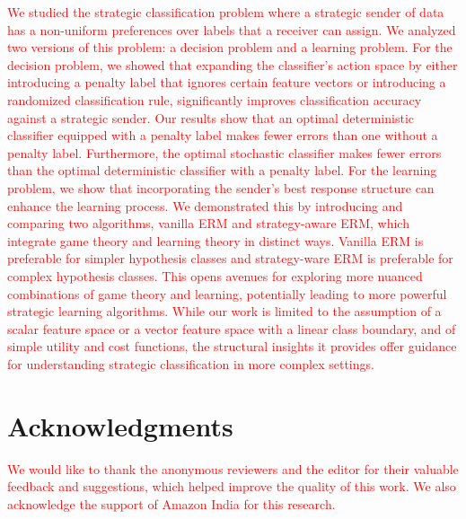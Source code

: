 \textcolor{red}{We studied the strategic classification problem where a strategic sender of data
has a non-uniform preferences over labels that a receiver can assign. We analyzed two versions of this problem: a decision 
problem and a learning problem. For the decision problem, we showed that expanding the classifier’s action space by either introducing a 
penalty label that ignores certain feature vectors or introducing a randomized classification rule, 
significantly improves classification accuracy against a strategic sender. Our results show that an optimal deterministic classifier equipped with a penalty label makes fewer errors than one without a 
penalty label. Furthermore, the optimal stochastic classifier makes fewer errors than the optimal 
deterministic classifier with a penalty label.
For the learning problem, we show that incorporating the sender's best response structure can enhance the 
learning 
process. We demonstrated this by introducing and comparing two algorithms, vanilla ERM and strategy-aware ERM, which 
integrate game theory and 
learning theory in distinct ways. Vanilla ERM is preferable for simpler hypothesis classes and strategy-ware ERM is 
preferable for complex hypothesis classes. This opens avenues for exploring more nuanced combinations of game theory and learning, 
potentially leading to more powerful strategic learning algorithms. While our work is limited to the assumption of a 
scalar feature space or a vector feature space with a linear class boundary, and of simple utility and cost functions, 
the structural insights it provides offer guidance for understanding strategic classification in more complex settings.} 

\section{Acknowledgments}

\textcolor{red}{We would like to thank the anonymous reviewers and the editor for their valuable feedback and 
suggestions, which helped improve the quality of this work. 
We also acknowledge the support of Amazon India for this research.}
